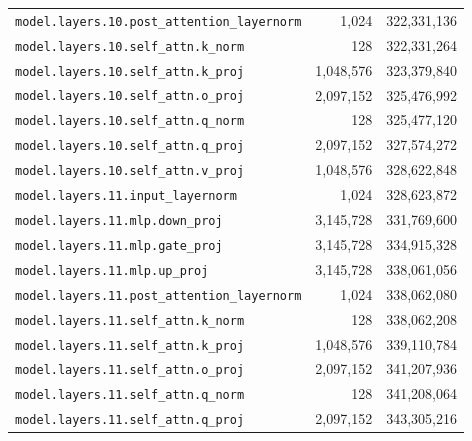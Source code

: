 \documentclass[10pt,a4paper]{article}
\theoremstyle{definition}
\begin{document}
\begin{appendices}
\begin{longtable}{p{9.5cm}rr}
\texttt{model.\allowbreak{}layers.\allowbreak{}10.\allowbreak{}post\_attention\_layernorm} & 1,024 & 322,331,136 \\
\texttt{model.\allowbreak{}layers.\allowbreak{}10.\allowbreak{}self\_attn.\allowbreak{}k\_norm} & 128 & 322,331,264 \\
\texttt{model.\allowbreak{}layers.\allowbreak{}10.\allowbreak{}self\_attn.\allowbreak{}k\_proj} & 1,048,576 & 323,379,840 \\
\texttt{model.\allowbreak{}layers.\allowbreak{}10.\allowbreak{}self\_attn.\allowbreak{}o\_proj} & 2,097,152 & 325,476,992 \\
\texttt{model.\allowbreak{}layers.\allowbreak{}10.\allowbreak{}self\_attn.\allowbreak{}q\_norm} & 128 & 325,477,120 \\
\texttt{model.\allowbreak{}layers.\allowbreak{}10.\allowbreak{}self\_attn.\allowbreak{}q\_proj} & 2,097,152 & 327,574,272 \\
\texttt{model.\allowbreak{}layers.\allowbreak{}10.\allowbreak{}self\_attn.\allowbreak{}v\_proj} & 1,048,576 & 328,622,848 \\
\texttt{model.\allowbreak{}layers.\allowbreak{}11.\allowbreak{}input\_layernorm} & 1,024 & 328,623,872 \\
\texttt{model.\allowbreak{}layers.\allowbreak{}11.\allowbreak{}mlp.\allowbreak{}down\_proj} & 3,145,728 & 331,769,600 \\
\texttt{model.\allowbreak{}layers.\allowbreak{}11.\allowbreak{}mlp.\allowbreak{}gate\_proj} & 3,145,728 & 334,915,328 \\
\texttt{model.\allowbreak{}layers.\allowbreak{}11.\allowbreak{}mlp.\allowbreak{}up\_proj} & 3,145,728 & 338,061,056 \\
\texttt{model.\allowbreak{}layers.\allowbreak{}11.\allowbreak{}post\_attention\_layernorm} & 1,024 & 338,062,080 \\
\texttt{model.\allowbreak{}layers.\allowbreak{}11.\allowbreak{}self\_attn.\allowbreak{}k\_norm} & 128 & 338,062,208 \\
\texttt{model.\allowbreak{}layers.\allowbreak{}11.\allowbreak{}self\_attn.\allowbreak{}k\_proj} & 1,048,576 & 339,110,784 \\
\texttt{model.\allowbreak{}layers.\allowbreak{}11.\allowbreak{}self\_attn.\allowbreak{}o\_proj} & 2,097,152 & 341,207,936 \\
\texttt{model.\allowbreak{}layers.\allowbreak{}11.\allowbreak{}self\_attn.\allowbreak{}q\_norm} & 128 & 341,208,064 \\
\texttt{model.\allowbreak{}layers.\allowbreak{}11.\allowbreak{}self\_attn.\allowbreak{}q\_proj} & 2,097,152 & 343,305,216 \\

\end{longtable}
\end{appendices}
\end{document}

